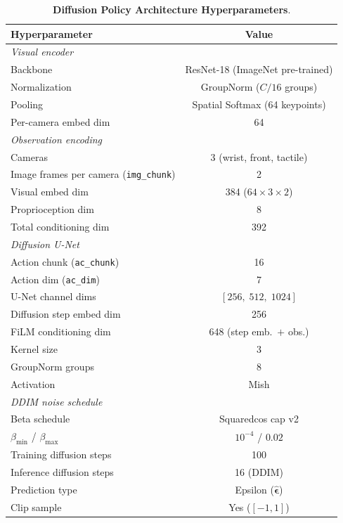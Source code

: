   \begin{table}[h]
  \centering
  \caption{\textbf{Diffusion Policy Architecture Hyperparameters}.}
  \label{tab:dp_arch}
  \begin{tabular}{lc}
  \toprule
  \textbf{Hyperparameter} & \textbf{Value} \\
  \midrule
  \multicolumn{2}{l}{\textit{Visual encoder}} \\
  Backbone            & ResNet-18 (ImageNet pre-trained) \\
  Normalization       & GroupNorm ($C/16$ groups) \\
  Pooling             & Spatial Softmax (64 keypoints) \\
  Per-camera embed dim & 64 \\
  \midrule
  \multicolumn{2}{l}{\textit{Observation encoding}} \\
  Cameras             & 3 (wrist, front, tactile) \\
  Image frames per camera (\texttt{img\_chunk}) & 2 \\
  Visual embed dim    & 384 ($64\times3\times2$) \\
  Proprioception dim  & 8 \\
  Total conditioning dim & 392 \\
  \midrule
  \multicolumn{2}{l}{\textit{Diffusion U-Net}} \\
  Action chunk (\texttt{ac\_chunk})  & 16 \\
  Action dim (\texttt{ac\_dim})      & 7 \\
  U-Net channel dims                 & $[256,\;512,\;1024]$ \\
  Diffusion step embed dim           & 256 \\
  FiLM conditioning dim              & 648 (step emb.\ $+$ obs.) \\
  Kernel size                        & 3 \\
  GroupNorm groups                   & 8 \\
  Activation                         & Mish \\
  \midrule
  \multicolumn{2}{l}{\textit{DDIM noise schedule}} \\
  Beta schedule                      & Squaredcos cap v2 \\
  $\beta_{\min}$ / $\beta_{\max}$    & $10^{-4}$ / $0.02$ \\
  Training diffusion steps           & 100 \\
  Inference diffusion steps          & 16 (DDIM) \\
  Prediction type                    & Epsilon ($\hat{\boldsymbol\epsilon}$) \\
  Clip sample                        & Yes ($[-1, 1]$) \\
  \bottomrule
  \end{tabular}
  \end{table}
  
